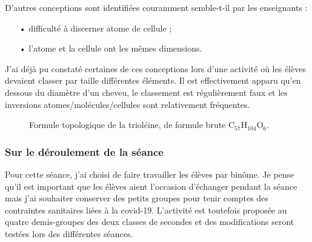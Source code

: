 \documentclass[12pt,a4paper]{article}
\begin{document}
D'autres conceptions sont identifiées couramment semble-t-il par les enseignants :
\begin{itemize}
\item[•] difficulté à discerner atome de cellule ;
\item[•] l'atome et la cellule ont les mêmes dimensions.
\end{itemize}

J'ai déjà pu constaté certaines de ces conceptions lors d'une activité où les élèves devaient classer par taille différentes éléments.
Il est effectivement apparu qu'en dessous du diamètre d'un cheveu, le classement est régulièrement faux et les inversions atomes/molécules/cellules sont relativement fréquentes.

\begin{figure}
\center
{}
\caption{Formule topologique de la trioléine, de formule brute $\text{C}_\text{57}\text{H}_\text{104}\text{O}_\text{6}$.}
\label{fig:trioleine}
\end{figure}

\subsubsection{Sur le déroulement de la séance}

Pour cette séance, j'ai choisi de faire travailler les élèves par binôme.
Je pense qu'il est important que les élèves aient l'occasion d'échanger pendant la séance mais j'ai souhaiter conserver des petits groupes pour tenir comptes des contraintes sanitaires liées à la covid-19.
L'activité est toutefois proposée au quatre demis-groupes des deux classes de secondes et des modifications seront testées lors des différentes séances.
\end{document}
